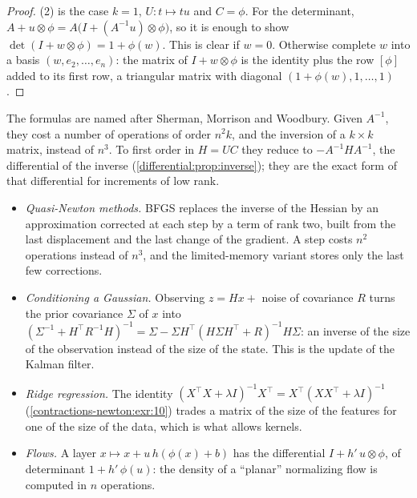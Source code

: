 \begin{notechapter}
\begin{proof}
(2) is the case $k = 1$, $U:t\mapsto tu$ and $C = \phi$. For the
determinant, $A + u\otimes\phi = A\bigl(I + (A^{-1}u)\otimes\phi\bigr)$,
so it is enough to show $\det(I + w\otimes\phi) = 1 + \phi(w)$. This is
clear if $w = 0$. Otherwise complete $w$ into a basis
$(w, e_2,\dots,e_n)$: the matrix of $I + w\otimes\phi$ is the identity
plus the row $[\phi]$ added to its first row, a triangular matrix with
diagonal $(1 + \phi(w), 1,\dots,1)$.
\end{proof}

The formulas are named after Sherman, Morrison and Woodbury. Given
$A^{-1}$, they cost a number of operations of order $n^2k$, and the
inversion of a $k\times k$ matrix, instead of $n^3$. To first order in
$H = UC$ they reduce to $-A^{-1}HA^{-1}$, the differential of the
inverse (\cref{differential:prop:inverse}); they are the exact form of
that differential for increments of low rank.

\begin{mlthread}
\begin{itemize}[nosep]
  \item \emph{Quasi-Newton methods.} BFGS replaces the inverse of the
        Hessian by an approximation corrected at each step by a term
        of rank two, built from the last displacement and the last
        change of the gradient. A step costs $n^2$ operations instead
        of $n^3$, and the limited-memory variant stores only the last
        few corrections.
  \item \emph{Conditioning a Gaussian.} Observing $z = Hx + $ noise of
        covariance $R$ turns the prior covariance $\Sigma$ of $x$ into
        $(\Sigma^{-1} + H^\top R^{-1}H)^{-1}
        = \Sigma - \Sigma H^\top(H\Sigma H^\top + R)^{-1}H\Sigma$: an
        inverse of the size of the observation instead of the size of
        the state. This is the update of the Kalman filter.
  \item \emph{Ridge regression.} The identity
        $(X^\top X + \lambda I)^{-1}X^\top
        = X^\top(XX^\top + \lambda I)^{-1}$
        (\cref{contractions-newton:exr:10}) trades a matrix of the
        size of the features for one of the size of the data, which is
        what allows kernels.
  \item \emph{Flows.} A layer $x\mapsto x + u\,h(\phi(x) + b)$ has the
        differential $I + h'\,u\otimes\phi$, of determinant
        $1 + h'\,\phi(u)$: the density of a ``planar'' normalizing flow
        is computed in $n$ operations.
\end{itemize}
\end{mlthread}


\end{notechapter}
